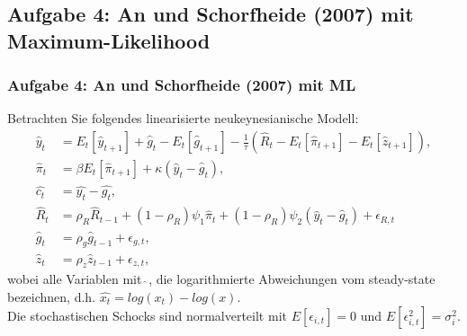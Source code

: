 \documentclass{beamer} %
\begin{document}
\subsection{Aufgabe 4: An und Schorfheide (2007) mit Maximum-Likelihood}
\begin{frame}\frametitle{Aufgabe 4: An und Schorfheide (2007) mit ML}
Betrachten Sie folgendes linearisierte neukeynesianische Modell:
    \begin{align*}
  \widehat{y}_t &= E_t[\widehat{y}_{t+1}] + \widehat{g}_t - E_t[\widehat{g}_{t+1}] - \frac{1}{\tau} (\widehat{R}_t - E_t[\widehat{\pi}_{t+1}] - E_t[\widehat{z}_{t+1}]),\\
  \widehat{\pi}_t &= \beta E_t[\widehat{\pi}_{t+1}]+\kappa(\widehat{y}_t-\widehat{g}_t),\\
    \widehat{c_t} &= \widehat{y_t }- \widehat{g_t},\\
  \widehat{R}_{t} &= \rho_R \widehat{R}_{t-1} + (1-\rho_R)\psi_1 \widehat{\pi}_{t} + (1-\rho_R)\psi_2 \left(\widehat{y}_{t}-\widehat{g}_{t}\right) + \epsilon_{R,t}\\
 \widehat{g}_{t} &= \rho_g \widehat{g}_{t-1} + \epsilon_{g,{t}},\\
 \widehat{z}_{t} &= \rho_z \widehat{z}_{t-1} + \epsilon_{z,{t}},
\end{align*}
wobei alle Variablen mit $\widehat{~}$, die logarithmierte Abweichungen vom steady-state bezeichnen, d.h. $\widehat{x_t}=log(x_t)-log(x)$. \\Die stochastischen Schocks sind normalverteilt mit $E[\epsilon_{i,t}]=0$ und $E[\epsilon_{i,t}^2]=\sigma_i^2$.
\end{frame}
\end{document}
